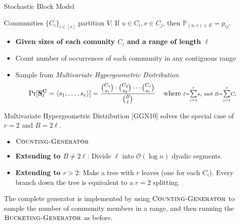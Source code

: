 \begin{block}{Stochastic Block Model}%

Communities $\{C_i\}_{i\in [r]}$ partition $V$: If $u\in C_i, v\in C_j$, then $\mathbb P_{(u, v)\in E} = p_{ij}$.
\begin{itemize}
\item [] \textbf{Given sizes of each comunity $C_i$ and a range of length $\ell$}
    \item Count number of occurrences of each community in any contiguous range%
    \item Sample from \emph{Multivariate Hypergeometric Distribution}%
\[
\Pr[\mathbf{S}^\mathbf{C}_\ell = \langle s_1, \ldots, s_r \rangle]
= \frac{\binom{C_1}{s_1}\cdot\binom{C_2}{s_2}\cdots\binom{C_r}{s_r}}{\binom{B}{\ell}}
\hspace{2ex}\textrm{ where } \scriptstyle{
    \ell = \mathlarger{\sum}\limits^{r}_{i=1} s_i \textrm{ and } B = \mathlarger{\sum}\limits^{r}_{i=1} C_i
}
\]
\end{itemize}


\begin{alertblock}{Multivariate Hypergeometric Distribution}
[GGN10] solves the special case of $r=2$ and $B = 2\ell$.
\begin{itemize}
    \item [] $\textsc{Counting-Generator}$
    \item \textbf{Extending to $B\not= 2\ell$}: Divide $\ell$ into $\mathcal O(\log n)$ dyadic segments.
    \item \textbf{Extending to $r>2$}: Make a tree with $r$ leaves (one for each $C_i$).
          Every branch down the tree is equivalent to a $r=2$ splitting.
\end{itemize}
\end{alertblock}

The complete generator is implemented by using $\textsc{Counting-Generator}$ to sample the number of
community members in a range, and then running the $\textsc{Bucketing-Generator}$ as before.
\end{block}
